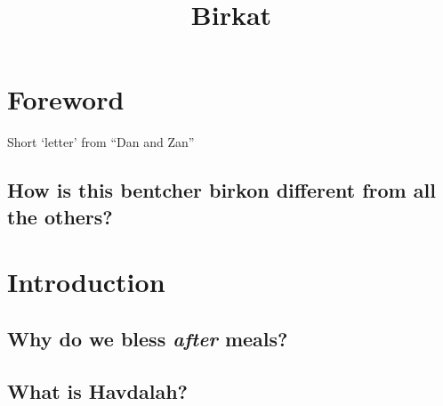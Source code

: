 ﻿\documentclass[a5paper, 12pt]{Birchon}
\title{Birkat}
\begin{document}
\fancyhead{} %
\fancyfoot[C]{\thepage}
\fancyfoot[R]{}


\begin{english}
{\tableofcontents}
\end{english}

\eject

\begin{english}
\section*{Foreword}
Short `letter' from ``Dan and Zan''

\subsection*{How is this bentcher birkon different from all the others?}

\section*{Introduction}
\subsection*{Why do we bless \emph{after} meals?}
\subsection*{What is Havdalah?}
\end{english}

\eject

\end{document}
